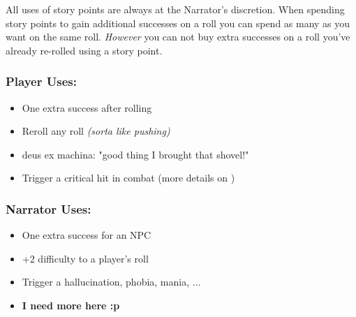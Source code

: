 All uses of story points are always at the Narrator's discretion.
When spending story points to gain additional successes on a roll
you can spend as many as you want on the same roll.
\textit{However} you can not buy extra successes on a roll you've already re-rolled using a story point.

\vspace{\topskip}
\begin{multicols}{2}
    \subsubsection{Player Uses:}
    \begin{itemize}[topsep=0pt, leftmargin=*]
        \item One extra success after rolling
        \item Reroll any roll \textit{(sorta like pushing)}
        \item deus ex machina: "good thing I brought that shovel!"
        \item Trigger a critical hit in combat (more details on )
    \end{itemize}
    \columnbreak
    
    \subsubsection{Narrator Uses:}
    \begin{itemize}[topsep=0pt, leftmargin=*]
        \item One extra success for an NPC
        \item +2 difficulty to a player's roll
        \item Trigger a hallucination, phobia, mania, ...
        \item \textbf{I need more here :p}
    \end{itemize}
    \vfill\null %
\end{multicols}


